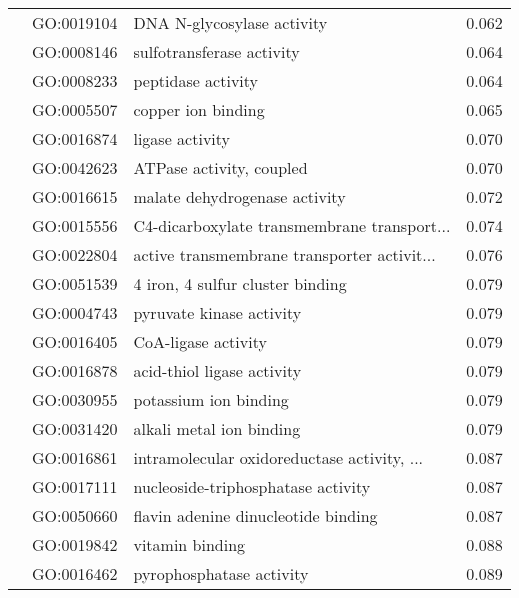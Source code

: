 \begin{longtable}{lllr}
   & GO:0019104 &                   DNA N-glycosylase activity &         0.062 \\
   & GO:0008146 &                    sulfotransferase activity &         0.064 \\
   & GO:0008233 &                           peptidase activity &         0.064 \\
   & GO:0005507 &                           copper ion binding &         0.065 \\
   & GO:0016874 &                              ligase activity &         0.070 \\
   & GO:0042623 &                     ATPase activity, coupled &         0.070 \\
   & GO:0016615 &                malate dehydrogenase activity &         0.072 \\
   & GO:0015556 &  C4-dicarboxylate transmembrane transport... &         0.074 \\
   & GO:0022804 &  active transmembrane transporter activit... &         0.076 \\
   & GO:0051539 &             4 iron, 4 sulfur cluster binding &         0.079 \\
   & GO:0004743 &                     pyruvate kinase activity &         0.079 \\
   & GO:0016405 &                          CoA-ligase activity &         0.079 \\
   & GO:0016878 &                   acid-thiol ligase activity &         0.079 \\
   & GO:0030955 &                        potassium ion binding &         0.079 \\
   & GO:0031420 &                     alkali metal ion binding &         0.079 \\
   & GO:0016861 &  intramolecular oxidoreductase activity, ... &         0.087 \\
   & GO:0017111 &           nucleoside-triphosphatase activity &         0.087 \\
   & GO:0050660 &          flavin adenine dinucleotide binding &         0.087 \\
   & GO:0019842 &                              vitamin binding &         0.088 \\
   & GO:0016462 &                     pyrophosphatase activity &         0.089 \\
\end{longtable}
